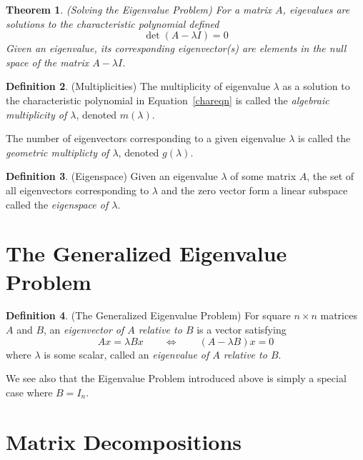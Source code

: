 \documentclass[12pt]{article}
\theoremstyle{plain}
\newtheorem{thm}{Theorem}[section]
\theoremstyle{definition}
\newtheorem{defn}[thm]{Definition}
\theoremstyle{remark}
\begin{document}
\begin{thm}\emph{(Solving the Eigenvalue Problem)}
For a matrix $A$, eigevalues are solutions to the \emph{characteristic
polynomial} defined
\begin{equation}
  \label{chareqn}
  \det(A-\lambda I) = 0
\end{equation}
Given an eigenvalue, its corresponding eigenvector(s) are elements in
the null space of the matrix $A-\lambda I$.
\end{thm}


\begin{defn}{(Multiplicities)}
The multiplicity of eigenvalue $\lambda$ as a solution to the
characteristic polynomial in Equation~\ref{chareqn} is called the
\emph{algebraic multiplicity of $\lambda$}, denoted $m(\lambda)$.

The number of eigenvectors corresponding to a given eigenvalue $\lambda$
is called the \emph{geometric multiplicty of $\lambda$}, denoted
$g(\lambda)$.
\end{defn}

\begin{defn}{(Eigenspace)}
Given an eigenvalue $\lambda$ of some matrix $A$, the set of all
eigenvectors corresponding to $\lambda$ and the zero vector form a
linear subspace called the \emph{eigenspace of $\lambda$}.
\end{defn}

\section{The Generalized Eigenvalue Problem}

\begin{defn}{(The Generalized Eigenvalue Problem)}
For square $n\times n$ matrices $A$ and $B$, an \emph{eigenvector of
$A$ relative to $B$} is a vector satisfying
\begin{equation}
  Ax = \lambda B x
  \qquad \Leftrightarrow \qquad
  (A - \lambda B) x = 0
\end{equation}
where $\lambda$ is some scalar, called an \emph{eigenvalue of $A$
relative to $B$}.

We see also that the Eigenvalue Problem introduced above is simply a
special case where $B=I_n$.
\end{defn}

\section{Matrix Decompositions}
\end{document}
